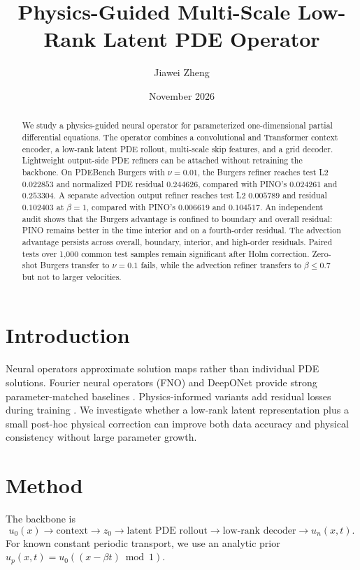 \documentclass[11pt]{article}
\title{Physics-Guided Multi-Scale Low-Rank Latent PDE Operator}
\author{Jiawei Zheng}
\date{November 2026}
\begin{document}
\maketitle

\begin{abstract}
We study a physics-guided neural operator for parameterized one-dimensional
partial differential equations. The operator combines a convolutional and
Transformer context encoder, a low-rank latent PDE rollout, multi-scale skip
features, and a grid decoder. Lightweight output-side PDE refiners can be
attached without retraining the backbone. On PDEBench Burgers with
$\nu=0.01$, the Burgers refiner reaches test L2 $0.022853$ and normalized PDE
residual $0.244626$, compared with PINO's $0.024261$ and $0.253304$. A
separate advection output refiner reaches test L2 $0.005789$ and residual
$0.102403$ at $\beta=1$, compared with PINO's $0.006619$ and $0.104517$. An
independent audit shows that the Burgers advantage is confined to boundary and
overall residual: PINO remains better in the time interior and on a
fourth-order residual. The advection advantage persists across overall,
boundary, interior, and high-order residuals. Paired tests over 1,000 common
test samples remain significant after Holm correction. Zero-shot Burgers
transfer to $\nu=0.1$ fails, while the advection refiner transfers to
$\beta\le 0.7$ but not to larger velocities.
\end{abstract}

\section{Introduction}
Neural operators approximate solution maps rather than individual PDE
solutions. Fourier neural operators (FNO) and DeepONet provide strong
parameter-matched baselines \cite{li2021fno,lu2021deeponet}. Physics-informed
variants add residual losses during training \cite{li2021pino}. We investigate
whether a low-rank latent representation plus a small post-hoc physical
correction can improve both data accuracy and physical consistency without
large parameter growth.

\section{Method}
The backbone is
\begin{equation}
u_0(x) \rightarrow \text{context}
\rightarrow z_0
\rightarrow \text{latent PDE rollout}
\rightarrow \text{low-rank decoder}
\rightarrow u_n(x,t).
\end{equation}
For known constant periodic transport, we use an analytic prior
$u_p(x,t)=u_0((x-\beta t)\bmod 1)$.
\end{document}
